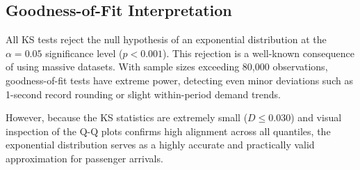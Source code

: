 \documentclass[11pt,a4paper]{article}
\begin{document}
\begin{table}[H]
\centering
\caption{Input Analysis and Distribution Fitting Summary}
\label{tab:input_analysis}
\end{table}

\subsection{Goodness-of-Fit Interpretation}
All KS tests reject the null hypothesis of an exponential distribution at the $\alpha = 0.05$ significance level ($p < 0.001$). This rejection is a well-known consequence of using massive datasets. With sample sizes exceeding 80,000 observations, goodness-of-fit tests have extreme power, detecting even minor deviations such as 1-second record rounding or slight within-period demand trends. 

However, because the KS statistics are extremely small ($D \le 0.030$) and visual inspection of the Q-Q plots confirms high alignment across all quantiles, the exponential distribution serves as a highly accurate and practically valid approximation for passenger arrivals.
\end{document}
